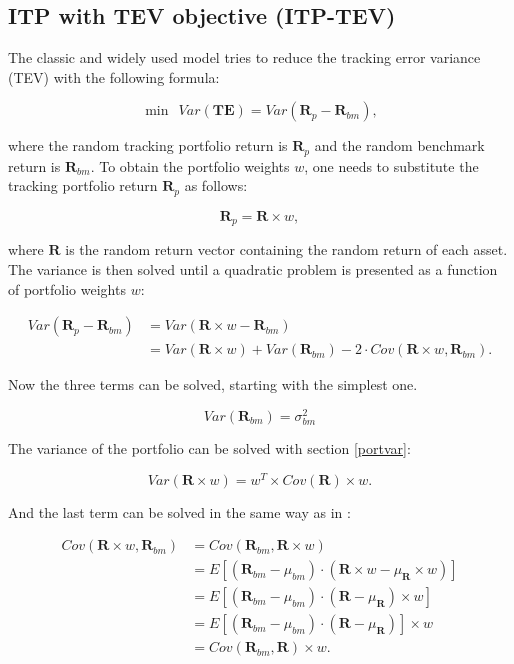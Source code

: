 \documentclass[
  oneside, a4paper, 12pt, openany]{book}
\theoremstyle{definition}
\theoremstyle{definition}
\theoremstyle{definition}
\theoremstyle{definition}
\theoremstyle{remark}
\begin{document}
\hypertarget{itpmste}{%
\subsection{ITP with TEV objective (ITP-TEV)}\label{itpmste}}

The classic and widely used model tries to reduce the tracking error variance (TEV) with the following formula:

\[
 \min \ \ Var(\pmb{TE}) = Var(\pmb{R}_{p}-\pmb{R}_{bm}),
\]

where the random tracking portfolio return is \(\pmb{R}_{p}\) and the random benchmark return is \(\pmb{R}_{bm}\). To obtain the portfolio weights \(w\), one needs to substitute the tracking portfolio return \(\pmb{R}_{p}\) as follows:

\[
  \pmb{R}_{p} = \pmb{R} \times w,
\]

where \(\pmb{R}\) is the random return vector containing the random return of each asset. The variance is then solved until a quadratic problem is presented as a function of portfolio weights \(w\):

\begin{align*}
 Var(\pmb{R}_{p}-\pmb{R}_{bm}) &= Var(\pmb{R} \times w - \pmb{R}_{bm}) \\
 &= Var(\pmb{R} \times w) + Var(\pmb{R}_{bm}) - 2 \cdot Cov(\pmb{R} \times w,\pmb{R}_{bm}).
\end{align*}

Now the three terms can be solved, starting with the simplest one.

\[
Var(\pmb{R}_{bm}) = \sigma_{bm}^2
\]

The variance of the portfolio can be solved with section \ref{portvar}:

\[
Var(\pmb{R} \times w) = w^T \times Cov(\pmb{R}) \times w.
\]

And the last term can be solved in the same way as in \citep{Eric2021}:

\begin{align*}
  Cov(\pmb{R} \times w, \pmb{R}_{bm}) &= Cov(\pmb{R}_{bm}, \pmb{R} \times w) \\
  &= E[(\pmb{R}_{bm}-\mu_{bm}) \cdot (\pmb{R} \times w-\mu_{\pmb{R}} \times w)] \\
  &= E[(\pmb{R}_{bm}-\mu_{bm}) \cdot (\pmb{R}-\mu_{\pmb{R}}) \times w] \\
  &= E[(\pmb{R}_{bm}-\mu_{bm}) \cdot (\pmb{R}-\mu_{\pmb{R}})] \times w \\
  &= Cov(\pmb{R}_{bm}, \pmb{R}) \times w.
\end{align*}
\end{document}
